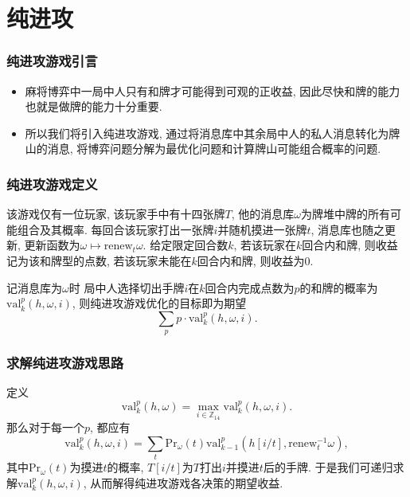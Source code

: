 \documentclass[xcolor=dvipsnames]{ctexbeamer}
\newcommand{\hand}{h}
\newcommand{\base}{\omega}
\newcommand{\prob}{\mathrm{Pr}}
\begin{document}
	\section{纯进攻}

	\begin{frame}
		\frametitle{纯进攻游戏引言}
		\begin{itemize}
			\item 麻将博弈中一局中人只有和牌才可能得到可观的正收益,
				因此尽快和牌的能力也就是做牌的能力十分重要.
			\item 所以我们将引入纯进攻游戏,
				通过将消息库中其余局中人的私人消息转化为牌山的消息,
				将博弈问题分解为最优化问题和计算牌山可能组合概率的问题.
		\end{itemize}
	\end{frame}

	\begin{frame}
		\frametitle{纯进攻游戏定义}
		\begin{definition}[纯进攻游戏]
			该游戏仅有一位玩家, 该玩家手中有十四张牌$T$,
			他的消息库$\base$为牌堆中牌的所有可能组合及其概率.
			每回合该玩家打出一张牌$i$并随机摸进一张牌$t$, 消息库也随之更新,
			更新函数为$\base\mapsto\mathrm{renew}_t{\base}$.
			给定限定回合数$k$,
			若该玩家在$k$回合内和牌, 则收益记为该和牌型的点数,
			若该玩家未能在$k$回合内和牌, 则收益为0.
		\end{definition}
		记消息库为$\base$时
		局中人选择切出手牌$i$在$k$回合内完成点数为$p$的和牌的概率为
		$\mathrm{val}_{k}^{p}(\hand, \base, i)$,
		则纯进攻游戏优化的目标即为期望
		\[\sum_{p}{p\cdot\mathrm{val}_{k}^{p}(\hand, \base, i)}.\]
	\end{frame}

	\begin{frame}
		\frametitle{求解纯进攻游戏思路}
		定义
		\[\mathrm{val}_{k}^{p}(\hand, \base)=
		\max_{i\in\mathbb{Z}_{14}}{\mathrm{val}_{k}^{p}(\hand, \base, i)}.\]
		那么对于每一个$p$, 都应有
		\[\mathrm{val}_{k}^{p}(\hand, \base, i)=
		\sum_{t}{\prob_{\base}}(t)\mathrm{val}_{k-1}^{p}(\hand[i/t],
		\mathrm{renew}_{t}^{-1}{\base}),\]
		其中$\prob_{\base}(t)$为摸进$t$的概率,
		$T[i/t]$为$T$打出$i$并摸进$t$后的手牌.
		于是我们可递归求解$\mathrm{val}_{k}^{p}(\hand, \base, i)$,
		从而解得纯进攻游戏各决策的期望收益.
	\end{frame}
\end{document}
